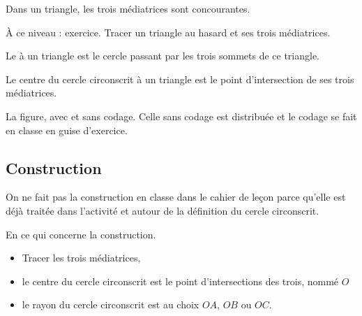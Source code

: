 

\begin{propriete}
    Dans un triangle, les trois médiatrices sont concourantes.
\end{propriete}

À ce niveau : exercice. Tracer un triangle au hasard et ses trois médiatrices.

\begin{definition}
    Le  à un triangle est le cercle passant par les trois sommets de ce triangle.
\end{definition}

\begin{propriete}
    Le centre du cercle circonscrit à un triangle est le point d'intersection de ses trois médiatrices.
\end{propriete}

La figure, avec et sans codage. Celle sans codage est distribuée et le codage se fait en classe en guise d'exercice.
\begin{center}
   \hfill
   
\end{center}

\subsection*{Construction}
On ne fait pas la construction en classe dans le cahier de leçon parce qu'elle est déjà traitée dans l'activité et autour de la définition du cercle circonscrit.

En ce qui concerne la construction.
\begin{center}
   
\end{center}

\begin{itemize}
    \item Tracer les trois médiatrices,
    \item le centre du cercle circonscrit est le point d'intersections des trois, nommé \( O\)
    \item le rayon du cercle circonscrit est au choix \( OA\), \( OB\) ou \( OC\).
\end{itemize}

